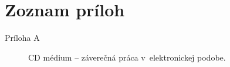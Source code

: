 \section*{Zoznam pr\'iloh}
\thispagestyle{empty}

\begin{description}
	\item[Príloha A] CD médium -- záverečná práca v~elektronickej podobe.
\end{description}
